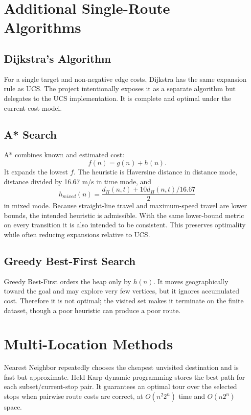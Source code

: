 \documentclass[12pt,a4paper,oneside]{report}
\begin{document}
\section{Additional Single-Route Algorithms}
\subsection{Dijkstra's Algorithm}
For a single target and non-negative edge costs, Dijkstra has the same expansion
rule as UCS. The project intentionally exposes it as a separate algorithm but
delegates to the UCS implementation. It is complete and optimal under the
current cost model.

\subsection{A* Search}
A* combines known and estimated cost:
\begin{equation}f(n)=g(n)+h(n).\end{equation}
It expands the lowest $f$. The heuristic is Haversine distance in distance mode,
distance divided by 16.67 m/s in time mode, and
\begin{equation}h_{mixed}(n)=\frac{d_H(n,t)+10d_H(n,t)/16.67}{2}\end{equation}
in mixed mode. Because straight-line travel and maximum-speed travel are lower
bounds, the intended heuristic is admissible. With the same lower-bound metric
on every transition it is also intended to be consistent. This preserves
optimality while often reducing expansions relative to UCS.

\subsection{Greedy Best-First Search}
Greedy Best-First orders the heap only by $h(n)$. It moves geographically toward
the goal and may explore very few vertices, but it ignores accumulated cost.
Therefore it is not optimal; the visited set makes it terminate on the finite
dataset, though a poor heuristic can produce a poor route.

\section{Multi-Location Methods}
Nearest Neighbor repeatedly chooses the cheapest unvisited destination and is
fast but approximate. Held-Karp dynamic programming stores the best path for
each subset/current-stop pair. It guarantees an optimal tour over the selected
stops when pairwise route costs are correct, at $O(n^2 2^n)$ time and
$O(n2^n)$ space.
\end{document}
